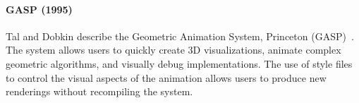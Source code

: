 

\paragraph{GASP (1995)}

Tal and Dobkin describe the Geometric Animation System, Princeton
(GASP)~\cite{tal1995visualization}. The system allows users to quickly create 3D
visualizations, animate complex geometric algorithms, and visually debug
implementations. The use of style files to control the visual aspects of the
animation allows users to produce new renderings without recompiling the system.



